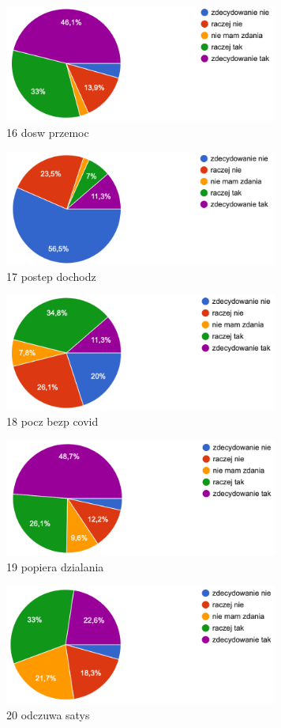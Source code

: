 \begin{figure}
    \includegraphics[width=9cm]{wyniki/16_dosw_przemoc}
    \caption{ 16 dosw przemoc }
\end{figure}

\begin{figure}
    \includegraphics[width=9cm]{wyniki/17_postep_dochodz}
    \caption{ 17 postep dochodz }
\end{figure}

\begin{figure}
    \includegraphics[width=9cm]{wyniki/18_pocz_bezp_covid}
    \caption{ 18 pocz bezp covid }
\end{figure}

\begin{figure}
    \includegraphics[width=9cm]{wyniki/19_popiera_dzialania}
    \caption{ 19 popiera dzialania }
\end{figure}

\begin{figure}
    \includegraphics[width=9cm]{wyniki/20_odczuwa_satys}
    \caption{ 20 odczuwa satys }
\end{figure}
